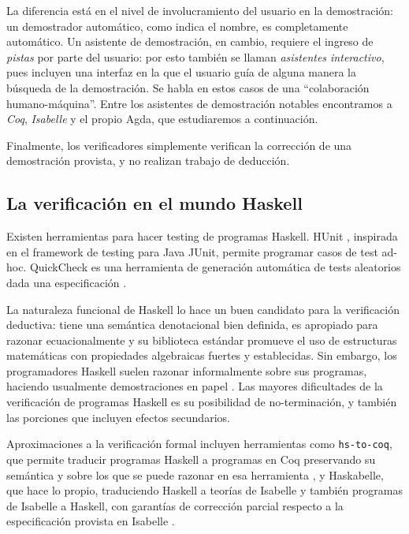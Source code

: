 \documentclass[11pt]{article} %
\begin{document}
La diferencia está en el nivel de involucramiento del usuario en la demostración: un demostrador automático, como indica el nombre, es completamente automático. Un asistente de demostración, en cambio, requiere el ingreso de \textit{pistas} por parte del usuario: por esto también se llaman \textit{asistentes interactivo}, pues incluyen una interfaz en la que el usuario guía de alguna manera la búsqueda de la demostración. Se habla en estos casos de una ``colaboración humano-máquina''. Entre los asistentes de demostración notables encontramos a \textit{Coq}, \textit{Isabelle} y el propio Agda, que estudiaremos a continuación. 

Finalmente, los verificadores simplemente verifican la corrección de una demostración provista, y no realizan trabajo de deducción. 

\subsection{La verificación en el mundo Haskell}
Existen herramientas para hacer testing de programas Haskell. HUnit \cite{HUnit}, inspirada en el framework de testing para Java JUnit, permite programar casos de test ad-hoc. QuickCheck es una herramienta de generación automática de tests aleatorios dada una especificación \cite{claessen2011quickcheck}.

La naturaleza funcional de Haskell lo hace un buen candidato para la verificación deductiva: tiene una semántica denotacional bien definida, es apropiado para razonar ecuacionalmente y su biblioteca estándar promueve el uso de estructuras matemáticas con propiedades algebraicas fuertes y establecidas. Sin embargo, los programadores Haskell suelen razonar informalmente sobre sus programas, haciendo usualmente demostraciones en papel \cite{DBLP:journals/corr/abs-1711-09286}. Las mayores dificultades de la verificación de programas Haskell es su posibilidad de no-terminación, y también las porciones que incluyen efectos secundarios.

Aproximaciones a la verificación formal incluyen herramientas como \texttt{hs-to-coq}, que permite traducir programas Haskell a programas en Coq preservando su semántica y sobre los que se puede razonar en esa herramienta \cite{DBLP:journals/corr/abs-1711-09286}, y Haskabelle, que hace lo propio, traduciendo Haskell a teorías de Isabelle y también programas de Isabelle a Haskell, con garantías de corrección parcial respecto a la especificación provista en Isabelle \cite{haftmann2010higher}.
\end{document}
